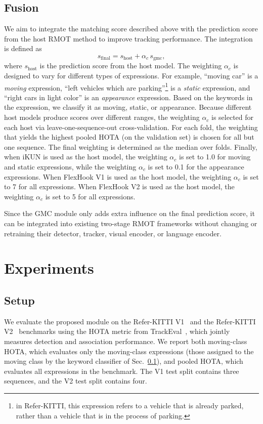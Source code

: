 \documentclass{article}
\begin{document}
\subsection{Fusion}
\label{sec:fusion}
We aim to integrate the matching score described above with the prediction score from the host RMOT method to improve tracking performance. The integration is defined as
\begin{equation}
  s_{\mathrm{final}} = s_{\mathrm{host}} + \alpha_{c}\,s_{\mathrm{gmc}},
  \label{eq:fusion}
\end{equation}
where $s_{\mathrm{host}}$ is the prediction score from the host model. The weighting $\alpha_c$ is designed to vary for different types of expressions. For example, \enquote{moving car} is a \emph{moving} expression, \enquote{left vehicles which are parking}\footnote{in Refer-KITTI, this expression refers to a vehicle that is already parked, rather than a vehicle that is in the process of parking.} is a \emph{static} expression, and \enquote{right cars in light color} is an \emph{appearance} expression. Based on the keywords in the expression, we classify it as moving, static, or appearance. Because different host models produce scores over different ranges, the weighting $\alpha_c$ is selected for each host via leave-one-sequence-out cross-validation. For each fold, the weighting that yields the highest pooled HOTA (on the validation set) is chosen for all but one sequence. The final weighting is determined as the median over folds. Finally, when iKUN is used as the host model, the weighting $\alpha_c$ is set to 1.0 for moving and static expressions, while the weighting $\alpha_c$ is set to 0.1 for the appearance expressions. When FlexHook V1 is used as the host model, the weighting $\alpha_c$ is set to 7 for all expressions. When FlexHook V2 is used as the host model, the weighting $\alpha_c$ is set to 5 for all expressions.

Since the GMC module only adds extra influence on the final prediction score, it can be integrated into existing two-stage RMOT frameworks without changing or retraining their detector, tracker, visual encoder, or language encoder.

\section{Experiments}
\label{sec:exp}


\subsection{Setup}
\label{sec:setup}
We evaluate the proposed module on the Refer-KITTI V1~\cite{transrmot} and the Refer-KITTI V2~\cite{temprmot} benchmarks using the HOTA metric from TrackEval~\cite{hota}, which jointly measures detection and association performance. We report both moving-class HOTA, which evaluates only the moving-class expressions (those assigned to the moving class by the keyword classifier of Sec.~\ref{sec:fusion}), and pooled HOTA, which evaluates all expressions in the benchmark. The V1 test split contains three sequences, and the V2 test split contains four.
\end{document}

